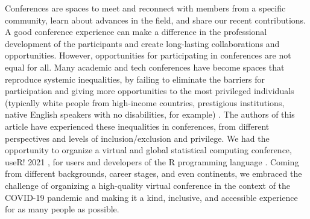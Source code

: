 \documentclass[10pt,letterpaper]{article}
\begin{document}
Conferences are spaces to meet and reconnect with members from a specific community, learn about advances in the field, and share our recent contributions.
A good conference experience can make a difference in the professional development of the participants and create long-lasting collaborations and opportunities. 
However, opportunities for participating in conferences are not equal for all. 
Many academic and tech conferences have become spaces that reproduce systemic inequalities, by failing to eliminate the barriers for participation and giving more opportunities to the most privileged individuals (typically white people from high-income countries, prestigious institutions, native English speakers with no disabilities, for example) \cite{arendDisparityConferenceRegistration2019, biggsAcademicConferenceChilly2018, depickerRethinkingInclusionDisability2020a, irishIncreasingParticipationUsing2020}.
The authors of this article have experienced these inequalities in conferences, from different perspectives and levels of inclusion/exclusion and privilege.
We had the opportunity to organize a virtual and global statistical computing conference, useR! 2021 \cite{sanchez-tapia_user_2021-2}, for users and developers of the R programming language \cite{r_core_team_2021}.
Coming from different backgrounds, career stages, and even continents, we embraced the challenge of organizing a high-quality virtual conference in the context of the COVID-19 pandemic and making it a kind, inclusive, and accessible experience for as many people as possible.
\end{document}
